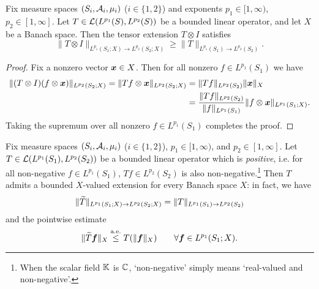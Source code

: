 \begin{prop}\label{prop:lb-ext}
  Fix measure spaces $(S_i,\mathcal{A}_i,\mu_i)$ ($i \in \{1,2\}$) and exponents $p_1 \in [1,\infty)$, $p_2 \in [1,\infty]$.
  Let $T \in \mathcal{L}(L^{p_1}(S),L^{p_2}(S))$ be a bounded linear operator, and let $X$ be a Banach space.
  Then the tensor extension $T \otimes I$ satisfies
  \begin{equation*}
    \|T \otimes I\|_{L^{p_1}(S_1;X) \to L^{p_2}(S_2;X)} \geq \|T\|_{L^{p_1}(S_1) \to L^{p_2}(S_2)}.
  \end{equation*}
\end{prop}

\begin{proof}
  Fix a nonzero vector $\bm{x} \in X$.
  Then for all nonzero $f \in L^{p_1}(S_1)$ we have
  \begin{equation*}
    \begin{aligned}
      \|(T \otimes I)(f \otimes \bm{x})\|_{L^{p_2}(S_2;X)} = \|Tf \otimes \bm{x}\|_{L^{p_2}(S_2;X)} &= \|Tf\|_{L^{p_2}(S_2)} \|\bm{x}\|_X \\
      &= \frac{\|Tf\|_{L^{p_2}(S_2)}}{\|f\|_{L^{p_1}(S_1)}} \|f \otimes \bm{x}\|_{L^{p_1}(S_1;X)}.
    \end{aligned}
  \end{equation*}
  Taking the supremum over all nonzero $f \in L^{p_1}(S_1)$ completes the proof.
\end{proof}

\begin{thm}\label{thm:positive-extensions}
  Fix measure spaces $(S_i,\mathcal{A}_i,\mu_i)$ ($i \in \{1,2\}$), $p_1 \in [1,\infty)$, and $p_2 \in [1,\infty]$.
  Let $T \in \mathcal{L}(L^{p_1}(S_1),L^{p_2}(S_2))$ be a bounded linear operator which is \emph{positive}, i.e. for all non-negative $f \in L^{p_1}(S_1)$, $Tf \in L^{p_2}(S_2)$ is also non-negative.\footnote{When the scalar field $\mathbb{K}$ is $\mathbb{C}$, `non-negative' simply means `real-valued and non-negative'.}
  Then $T$ admits a bounded $X$-valued extension for every Banach space $X$: in fact, we have
  \begin{equation*}
    \|\widetilde{T}\|_{L^{p_1}(S_1;X) \to L^{p_2}(S_2;X)} = \|T\|_{L^{p_1}(S_1) \to L^{p_2}(S_2)}
  \end{equation*}
  and the pointwise estimate
  \begin{equation}\label{eq:positive-pw-est}
    \|\widetilde{T}\bm{f}\|_X \stackrel{\mathrm{a.e.}}{\leq} T(\|\bm{f}\|_X) \qquad \forall \bm{f} \in L^{p_1}(S_1;X).
  \end{equation}
  
\end{thm}

